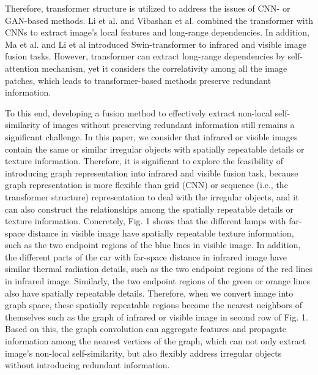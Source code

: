 \documentclass[journal]{IEEEtran}
\begin{document}
Therefore, transformer structure is utilized to address the issues of CNN- or GAN-based methods. Li et al. \cite{li2022cgtf} and Vibashan et al. \cite{vs2021image} combined the transformer with CNNs to extract image's local features and long-range dependencies. In addition, Ma et al. \cite{ma2022swinfusion} and Li et al \cite{wang2022swinfuse} introduced Swin-transformer to infrared and visible image fusion tasks. However, transformer can extract long-range dependencies by self-attention mechanism, yet it considers the correlativity among all the image patches, which leads to transformer-based methods preserve redundant information.

To this end, developing a fusion method to effectively extract non-local self-similarity of images without preserving redundant information still remains a significant challenge. In this paper, we consider that infrared or visible images contain the same or similar irregular objects with spatially repeatable details or texture information. Therefore, it is significant to explore the feasibility of introducing graph representation into infrared and visible fusion task, because graph representation is more flexible than grid (CNN) or sequence (i.e., the transformer structure) representation to deal with the irregular objects, and it can also construct the relationships among the spatially repeatable details or texture information. Concretely, Fig. 1 shows that the different lamps with far-space distance in visible image have spatially repeatable texture information, such as the two endpoint regions of the blue lines in visible image. In addition, the different parts of the car with far-space distance in infrared image have similar thermal radiation details, such as the two endpoint regions of the red lines in infrared image. Similarly, the two endpoint regions of the green or orange lines also have spatially repeatable details. Therefore, when we convert image into graph space, these spatially repeatable regions become the nearest neighbors of themselves such as the graph of infrared or visible image in second row of Fig. 1. Based on this, the graph convolution can aggregate features and propagate information among the nearest vertices of the graph, which can not only extract image's non-local self-similarity, but also flexibly address irregular objects without introducing redundant information.
\end{document}
